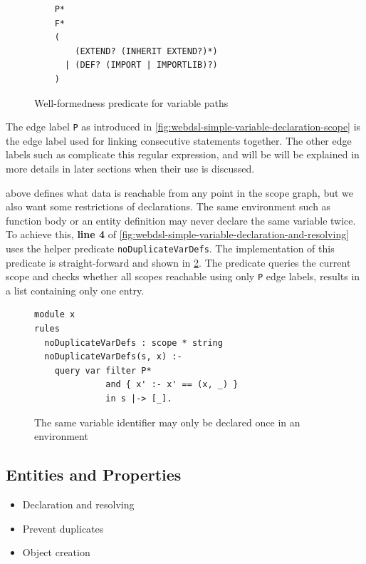       \begin{figure}
        \begin{verbatim}
    P*
    F*
    (
        (EXTEND? (INHERIT EXTEND?)*)
      | (DEF? (IMPORT | IMPORTLIB)?)
    )
        \end{verbatim}
        \caption{\label{fig:webdsl-simple-variable-well-formedness}Well-formedness predicate for variable paths}
      \end{figure}

      The edge label \texttt{P} as introduced in \cref{fig:webdsl-simple-variable-declaration-scope} is the edge label used for linking consecutive statements together. The other edge labels such as complicate this regular expression, and will be will be explained in more details in later sections when their use is discussed.

       above defines what data is reachable from any point in the scope graph, but we also want some restrictions of declarations. The same environment such as function body or an entity definition may never declare the same variable twice. To achieve this, \textbf{line 4} of \cref{fig:webdsl-simple-variable-declaration-and-resolving} uses the helper predicate \texttt{noDuplicateVarDefs}. The implementation of this predicate is straight-forward and shown in \cref{fig:webdsl-simple-variable-no-duplicates}. The predicate queries the current scope and checks whether all scopes reachable using only \texttt{P} edge labels, results in a list containing only one entry.

      \begin{figure}
        \begin{verbatim}
module x
rules
  noDuplicateVarDefs : scope * string
  noDuplicateVarDefs(s, x) :-
    query var filter P*
              and { x' :- x' == (x, _) }
              in s |-> [_].
        \end{verbatim}
        \caption{\label{fig:webdsl-simple-variable-no-duplicates}The same variable identifier may only be declared once in an environment}
      \end{figure}

    \subsection{\label{subsec:simple-entities}Entities and Properties}

      \begin{itemize}
        \item Declaration and resolving
        \item Prevent duplicates
        \item Object creation
      \end{itemize}


